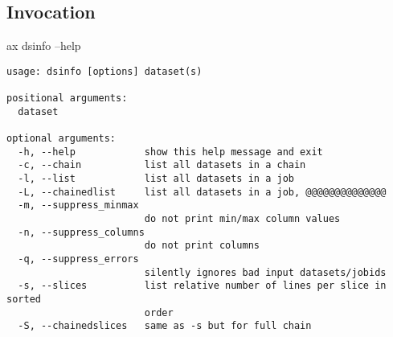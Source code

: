 \subsection{Invocation}
\begin{shell}
ax dsinfo --help
\end{shell}
\begin{snugshade}
\begin{verbatim}
usage: dsinfo [options] dataset(s)

positional arguments:
  dataset

optional arguments:
  -h, --help            show this help message and exit
  -c, --chain           list all datasets in a chain
  -l, --list            list all datasets in a job
  -L, --chainedlist     list all datasets in a job, @@@@@@@@@@@@@@
  -m, --suppress_minmax
                        do not print min/max column values
  -n, --suppress_columns
                        do not print columns
  -q, --suppress_errors
                        silently ignores bad input datasets/jobids
  -s, --slices          list relative number of lines per slice in sorted
                        order
  -S, --chainedslices   same as -s but for full chain
\end{verbatim}
\end{snugshade}

